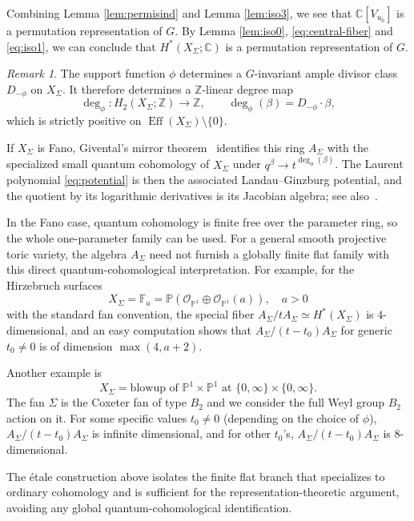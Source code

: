 \documentclass[12pt]{amsart}
\theoremstyle{remark}
\newtheorem{remark}[theorem]{Remark}
\begin{document}
Combining Lemma \ref{lem:permisind} and Lemma \ref{lem:iso3}, we see that $\mathbb{C}[V_{u_0}]$ is a permutation representation of $G$. 
By Lemma \ref{lem:iso0}, \eqref{eq:central-fiber} and \eqref{eq:iso1}, 
we can conclude that $H^*(X_\Sigma; \mathbb{C})$ is a permutation representation of $G$. 

\begin{remark}
The support function $\phi$ determines a $G$-invariant ample divisor class
$D_{-\phi}$ on $X_\Sigma$. 
It therefore determines a $\mathbb{Z}$-linear degree map
\[
\deg_{\phi}:H_{2}(X_{\Sigma};\mathbb{Z})\longrightarrow \mathbb{Z},\qquad \deg_{\phi}(\beta) = D_{-\phi}\cdot \beta,
\]
which is strictly positive on \(\operatorname{Eff}(X_{\Sigma})\setminus \{0\}\).

If \(X_{\Sigma}\) is Fano, Givental's mirror theorem~\cite{Givental} identifies this ring \(A_{\Sigma}\) with the specialized small quantum cohomology of \(X_{\Sigma}\) under \(q^{\beta}\to t^{\deg_{\phi}(\beta)}\). The Laurent polynomial \eqref{eq:potential} is then the associated Landau--Ginzburg potential, and the quotient by its logarithmic derivatives is its Jacobian algebra; see also~\cite[Proposition 3.3]{OstroverTyomkin}.

In the Fano case, quantum cohomology is finite free over the parameter ring,
so the whole one-parameter family can be used.  For a general smooth
projective toric variety, the algebra $A_\Sigma$ need not furnish a globally finite flat family with this direct quantum-cohomological interpretation.
For example, for the Hirzebruch surfaces 
$$X_\Sigma = \mathbb{F}_a=\mathbb{P}(\mathcal{O}_{\mathbb{P}^1}\oplus \mathcal{O}_{\mathbb{P}^1}(a)), \quad a>0$$
with the standard fan convention, the special fiber $A_\Sigma/tA_\Sigma \simeq H^*(X_\Sigma)$ is $4$-dimensional, and an easy computation shows that $A_\Sigma/(t-t_0)A_{\Sigma}$ for generic $t_0\neq 0$ is of  dimension $\max(4,a+2)$. 

Another example is 
$$X_\Sigma = \text{blowup of  $\mathbb{P}^1\times \mathbb{P}^1$ at $\{0,\infty\}\times \{0,\infty\}$}.$$
The fan $\Sigma$ is the Coxeter fan of type $B_2$ and we consider the full Weyl group $B_2$ action on it. 
For some specific values $t_0\neq 0$ (depending on the choice of $\phi$), $A_\Sigma/(t-t_0)A_\Sigma$ is infinite dimensional, and for other $t_0$'s, $A_\Sigma/(t-t_0)A_\Sigma$ is $8$-dimensional. 

The \'etale construction above isolates the finite flat branch that
specializes to ordinary cohomology and is sufficient for the representation-theoretic argument, avoiding any global quantum-cohomological identification.


\end{remark}
\end{document}
